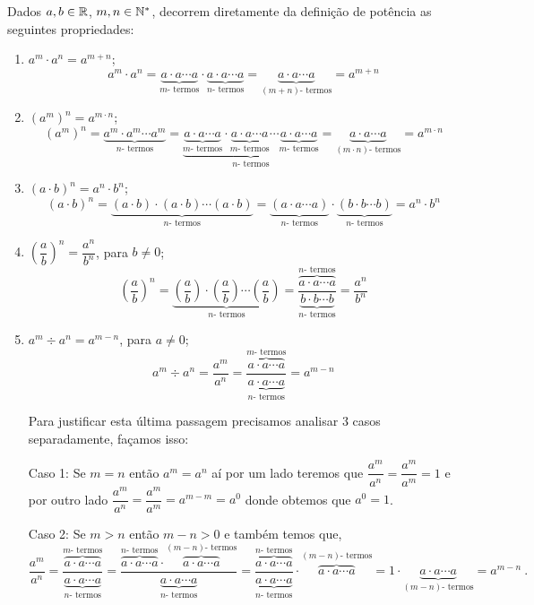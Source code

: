   Dados $a, b \in \mathbb{R}$, $m, n \in \mathbb{N}^{*}$, decorrem diretamente da definição de potência as seguintes propriedades:
 \begin{enumerate}[P1)]
 \item $a^m \cdot a^n= a^{m + n}$;
 \[a^m \cdot a^n = \underbrace{a \cdot a \cdots a}_{m \text{- termos}}\cdot \underbrace{a \cdot a \cdots a}_{n \text{- termos}}= \underbrace{a \cdot a \cdots a}_{(m+n) \text{- termos}}= a^{m + n} \]

 \item $(a^m)^n= a^{m \cdot n}$;
 \[(a^m)^n= \underbrace{a^m \cdot a^m \cdots a^m}_{n \text{- termos}}= \underbrace{\underbrace{a \cdot a \cdots a}_{m \text{- termos}} \cdot \underbrace{a \cdot a \cdots a}_{m \text{- termos}} \cdots \underbrace{a \cdot a \cdots a}_{m \text{- termos}}}_{n \text{- termos}}= \underbrace{a \cdot a \cdots a}_{(m \cdot n) \text{- termos}}= a^{m \cdot n}\]

 \item $(a \cdot b)^n= a^n \cdot b^n$;
 \[(a \cdot b)^n= \underbrace{(a \cdot b) \cdot (a\cdot b) \cdots (a \cdot b)}_{n \text{- termos}}= \underbrace{(a \cdot a \cdots a)}_{n \text{- termos}} \cdot \underbrace{(b \cdot b \cdots b)}_{n \text{- termos}}= a^n \cdot b^n\]

 \item $\left(\dfrac{a}{b}\right)^n= \dfrac{a^n}{b^n}$, para $b \neq 0$;
 \[\left(\dfrac{a}{b}\right)^n=
 \underbrace{\left(\dfrac{a}{b}\right) \cdot \left(\dfrac{a}{b}\right) \cdots \left(\dfrac{a}{b}\right)}_{n \text{- termos}}= \dfrac{\overbrace{a \cdot a \cdots a}^{n \text{- termos}}}{\underbrace{b \cdot b \cdots b}_{n \text{- termos}}}= \dfrac{a^n}{b^n}\]

 \item $a^m \div a^n= a^{m - n}$, para $a \neq 0$;
 \[a^m \div a^n= \dfrac{a^m}{a^n}= \dfrac{\overbrace{a \cdot a \cdots a}^{m \text{- termos}}}{\underbrace{a \cdot a \cdots a}_{n \text{- termos}}} = a^{m - n}\]

 Para justificar esta última passagem precisamos analisar 3 casos separadamente, façamos isso:

 Caso 1: Se $m=n$ então $a^m= a^n$ aí por um lado teremos que $\dfrac{a^m}{a^n}= \dfrac{a^m}{a^m}= 1$ e por outro lado $\dfrac{a^m}{a^n}= \dfrac{a^m}{a^m}= a^{m-m}= a^{0}$ donde obtemos que $a^{0}= 1$.

 Caso 2: Se $m > n$ então $m - n> 0$ e também temos que,
 \[\dfrac{a^m}{a^n}= \dfrac{\overbrace{a \cdot a \cdots a}^{m \text{- termos}}}{\underbrace{a \cdot a \cdots a}_{n \text{- termos}}}=
 \dfrac{\overbrace{a \cdot a \cdots a}^{n \text{- termos}} \cdot \overbrace{a \cdot a \cdots a}^{(m-n) \text{- termos}}}{\underbrace{a \cdot a \cdots a}_{n \text{- termos}}}=
 \frac{\overbrace{a \cdot a \cdots a}^{n \text{- termos}}}{\underbrace{a \cdot a \cdots a}_{n \text{- termos}}} \cdot \overbrace{a \cdot a \cdots a}^{(m-n) \text{- termos}} =
 1 \cdot \underbrace{a \cdot a \cdots a}_{(m-n) \text{- termos}}= a^{m-n} \ .\]


\end{enumerate}
